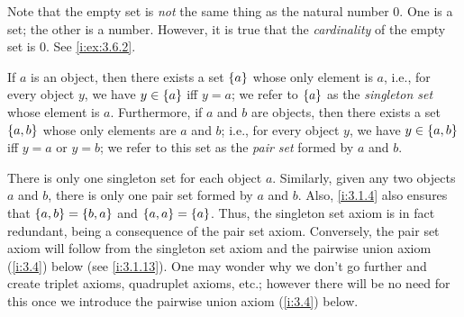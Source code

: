 \begin{rmk}\label{i:3.1.8}
  Note that the empty set is \emph{not} the same thing as the natural number \(0\).
  One is a set;
  the other is a number.
  However, it is true that the \emph{cardinality} of the empty set is \(0\).
  See \cref{i:ex:3.6.2}.
\end{rmk}

\begin{ax}\label{i:3.3}
  If \(a\) is an object, then there exists a set \(\left\lbrace a\right\rbrace\) whose only element is \(a\), i.e., for every object \(y\), we have \(y \in \left\lbrace a\right\rbrace\) iff \(y = a\);
  we refer to \(\left\lbrace a\right\rbrace\) as the \emph{singleton set} whose element is \(a\).
  Furthermore, if \(a\) and \(b\) are objects, then there exists a set \(\left\lbrace a, b\right\rbrace\) whose only elements are \(a\) and \(b\);
  i.e., for every object \(y\), we have \(y \in \left\lbrace a, b\right\rbrace\) iff \(y = a\) or \(y = b\);
  we refer to this set as the \emph{pair set} formed by \(a\) and \(b\).
\end{ax}

\begin{rmk}\label{i:3.1.9}
  There is only one singleton set for each object \(a\).
  Similarly, given any two objects \(a\) and \(b\), there is only one pair set formed by \(a\) and \(b\).
  Also, \cref{i:3.1.4} also ensures that \(\left\lbrace a, b\right\rbrace = \left\lbrace b, a\right\rbrace\) and \(\left\lbrace a, a\right\rbrace = \left\lbrace a\right\rbrace\).
  Thus, the singleton set axiom is in fact redundant, being a consequence of the pair set axiom.
  Conversely, the pair set axiom will follow from the singleton set axiom and the pairwise union axiom (\cref{i:3.4}) below (see \cref{i:3.1.13}).
  One may wonder why we don't go further and create triplet axioms, quadruplet axioms, etc.;
  however there will be no need for this once we introduce the pairwise union axiom (\cref{i:3.4}) below.
\end{rmk}

